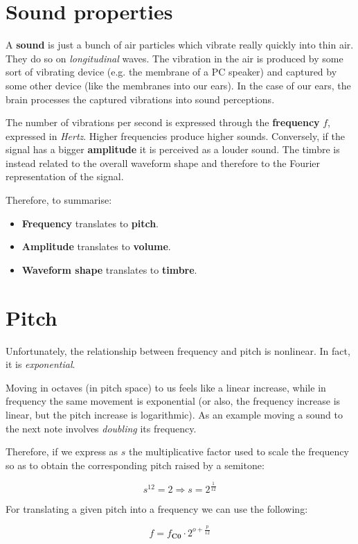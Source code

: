 \section{Sound properties}
A \textbf{sound} is just a bunch of air particles which vibrate really quickly into thin air. They do so on \emph{longitudinal} waves. The vibration in the air is produced by some sort of vibrating device (e.g. the membrane of a PC speaker) and captured by some other device (like the membranes into our ears). In the case of our ears, the brain processes the captured vibrations into sound perceptions.

The number of vibrations per second is expressed through the \textbf{frequency} $f$, expressed in \emph{Hertz}. Higher frequencies produce higher sounds. Conversely, if the signal has a bigger \textbf{amplitude} it is perceived as a louder sound. The timbre is instead related to the overall waveform shape and therefore to the Fourier representation of the signal.

Therefore, to summarise:
\begin{itemize}
    \item \textbf{Frequency} translates to \textbf{pitch}.
    \item \textbf{Amplitude} translates to \textbf{volume}.
    \item \textbf{Waveform shape} translates to \textbf{timbre}.
\end{itemize}

\section{Pitch}
Unfortunately, the relationship between frequency and pitch is nonlinear. In fact, it is \emph{exponential}.

Moving in octaves (in pitch space) to us feels like a linear increase, while in frequency the same movement is exponential (or also, the frequency increase is linear, but the pitch increase is logarithmic). As an example moving a sound to the next note involves \emph{doubling} its frequency.

Therefore, if we express as $s$ the multiplicative factor used to scale the frequency so as to obtain the corresponding pitch raised by a semitone:

$$s^{12} = 2 \Rightarrow s = 2^{\frac{1}{12}}$$

For translating a given pitch into a frequency we can use the following:

$$f = f_\textbf{C0} \cdot 2^{o+\frac{p}{12}}$$

